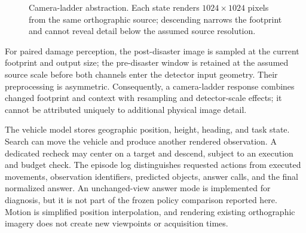 \begin{figure}[htbp]
\centering
\resizebox{\linewidth}{!}{}
\caption{Camera-ladder abstraction. Each state renders $1024\times1024$ pixels from the same orthographic source; descending narrows the footprint and cannot reveal detail below the assumed source resolution.}
\label{fig:ladder}
\end{figure}

For paired damage perception, the post-disaster image is sampled at the current footprint and output size; the pre-disaster window is retained at the assumed source scale before both channels enter the detector input geometry. Their preprocessing is asymmetric. Consequently, a camera-ladder response combines changed footprint and context with resampling and detector-scale effects; it cannot be attributed uniquely to additional physical image detail.

The vehicle model stores geographic position, height, heading, and task state. Search can move the vehicle and produce another rendered observation. A dedicated recheck may center on a target and descend, subject to an execution and budget check. The episode log distinguishes requested actions from executed movements, observation identifiers, predicted objects, answer calls, and the final normalized answer. An unchanged-view answer mode is implemented for diagnosis, but it is not part of the frozen policy comparison reported here. Motion is simplified position interpolation, and rendering existing orthographic imagery does not create new viewpoints or acquisition times.
